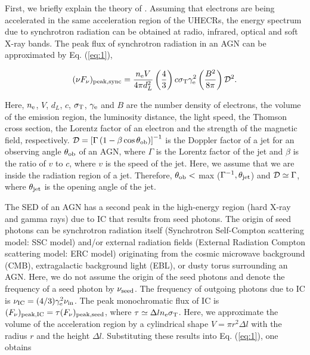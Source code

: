 \documentclass{aastex6}
\begin{document}
First, we briefly explain the theory of \cite{PL}.
Assuming that electrons are being accelerated in the same acceleration region of the UHECRs, the energy spectrum due to synchrotron radiation can be obtained at radio, infrared, optical and soft X-ray bands.
The peak flux of synchrotron radiation in an AGN can be approximated by Eq. (\ref{eq:1}),

\begin{equation}
(\nu F_{\nu})_{\rm{peak,sync}} = \frac{n_{\rm{e}}V}{4\pi d^{2}_{L}}\left(\frac{4}{3}\right)c\sigma_{\rm{T}}\gamma^{2}_{\rm{e}}\left(\frac{B^{2}}{8\pi}\right)\cal{D}\rm^{2}.
\label{eq:1}
\end{equation}

\noindent Here, $n_{\rm{e}}$,  $V$, $d_{L}$, $c$, $\sigma_{\rm{T}}$, $\gamma_{\rm{e}}$ and $B$ are the number density of electrons, the volume of the emission region, the luminosity distance, the light speed, the Thomson cross section, the Lorentz factor of an electron and the strength of the magnetic field, respectively.
$\cal{D}\rm{} = \left[\Gamma\left(1-\beta\cos\theta_{\rm ob}\right)\right]^{-1}$ is the Doppler factor of a jet for an observing angle $\theta_{\rm ob}$ of an AGN, where $\Gamma$ is the Lorentz factor of the jet and $\beta$ is the ratio of $v$ to $c$, where $v$ is the speed of the jet.
Here, we assume that we are inside the radiation region of a jet.
Therefore, $\theta_{\rm{ob}} <$ max ($\Gamma^{-1},\theta_{\rm{jet}}$) and $\cal{D}\rm{} \simeq \Gamma$, where $\theta_{\rm{jet}}$ is the opening angle of the jet.

The SED of an AGN has a second peak in the high-energy region (hard X-ray and gamma rays) due to IC that results from seed photons.
The origin of seed photons can be synchrotron radiation itself (Synchrotron Self-Compton scattering model: SSC model) and/or external radiation fields (External Radiation Compton scattering model: ERC model) originating from the cosmic microwave background (CMB), extragalactic background light (EBL), or dusty torus surrounding an AGN.
Here, we do not assume the origin of the seed photons and denote the frequency of a seed photon by $\nu_{\rm{seed}}$.
The frequency of outgoing photons due to IC is $\nu_{\rm{IC}} = (4/3)\gamma_{\rm{e}}^{2}\nu_{\rm{in}}$.
The peak monochromatic flux of IC is $(F_{\nu})_{\rm{peak,IC}} = \tau (F_{\nu})_{\rm{peak,seed}}$, where $\tau \simeq \Delta l n_{\rm{e}}\sigma_{\rm{T}}$.
Here, we approximate the volume of the acceleration region by a cylindrical shape $V = \pi r^{2}\Delta l$ with the radius $r$ and the height $\Delta l$.
Substituting these results into Eq. (\ref{eq:1}), one obtains
\end{document}
